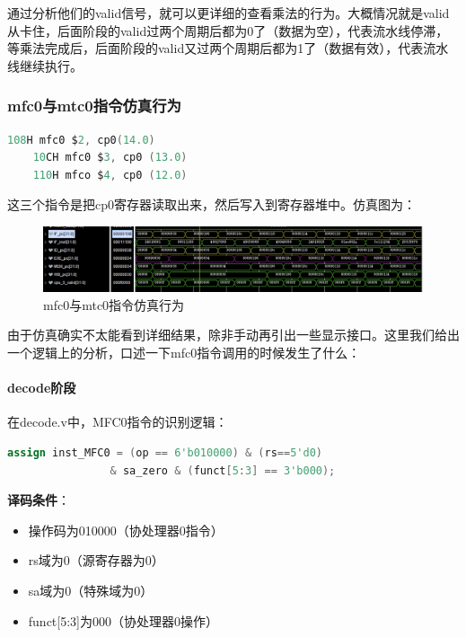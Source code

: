 \documentclass[a4paper]{article}
\begin{document}
通过分析他们的valid信号，就可以更详细的查看乘法的行为。大概情况就是valid从卡住，后面阶段的valid过两个周期后都为0了（数据为空），代表流水线停滞，等乘法完成后，后面阶段的valid又过两个周期后都为1了（数据有效），代表流水线继续执行。

\subsubsection{mfc0与mtc0指令仿真行为}

\begin{lstlisting}[language=Verilog]
    108H mfc0 $2, cp0(14.0)
    10CH mfc0 $3, cp0 (13.0)
    110H mfco $4, cp0 (12.0)
\end{lstlisting}

这三个指令是把cp0寄存器读取出来，然后写入到寄存器堆中。仿真图为：

\begin{figure}[H]
    \centering
    \includegraphics[width=\textwidth]{img/复现流水线仿真/mf.png}
    \caption{mfc0与mtc0指令仿真行为}
\end{figure}

由于仿真确实不太能看到详细结果，除非手动再引出一些显示接口。这里我们给出一个逻辑上的分析，口述一下mfc0指令调用的时候发生了什么：

\paragraph{decode阶段} 

在decode.v中，MFC0指令的识别逻辑：

\begin{lstlisting}[language=Verilog, caption=MFC0指令识别]
assign inst_MFC0 = (op == 6'b010000) & (rs==5'd0) 
                & sa_zero & (funct[5:3] == 3'b000);
\end{lstlisting}

\textbf{译码条件}：
\begin{itemize}
    \item 操作码为010000（协处理器0指令）
    \item rs域为0（源寄存器为0）
    \item sa域为0（特殊域为0）
    \item funct[5:3]为000（协处理器0操作）
\end{itemize}
\end{document}
